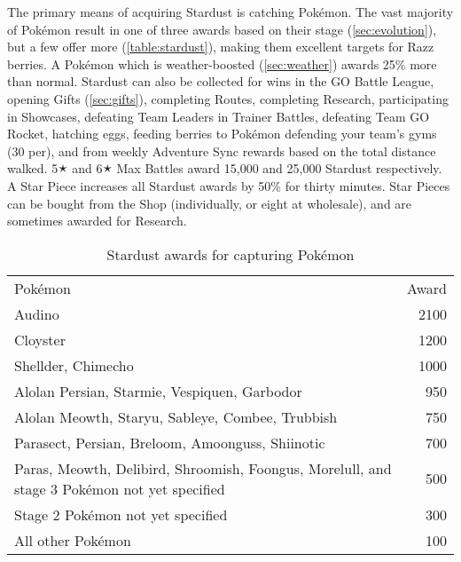 The primary means of acquiring Stardust is catching Pokémon.
The vast majority of Pokémon result in one of three awards based on their stage
 (\autoref{sec:evolution}), but a few offer more (\autoref{table:stardust}),
 making them excellent targets for Razz berries.
A Pokémon which is weather-boosted (\autoref{sec:weather}) awards 25\% more than normal.
Stardust can also be collected for wins in the GO Battle League,
  opening Gifts (\autoref{sec:gifts}),
  completing Routes,
  completing Research,
  participating in Showcases,
  defeating Team Leaders in Trainer Battles,
  defeating Team GO Rocket,
  hatching eggs,
  feeding berries to Pokémon defending your team's gyms (30 per),
  and from weekly Adventure Sync rewards based on the total distance walked.
5🟉 and 6🟉 Max Battles award 15,000 and 25,000 Stardust respectively.
A Star Piece increases all Stardust awards by 50\% for thirty minutes.
Star Pieces can be bought from the Shop (individually, or eight at wholesale), and are sometimes awarded for Research.
\begin{table}
\centering
\begin{tabular}{p{}r}
Pokémon & Award \\ %
\Midrule
Audino & 2100 \\ %
\rowcolor{Gray!25}
Cloyster & 1200 \\%
Shellder, Chimecho & 1000 \\%
\rowcolor{Gray!25}
Alolan Persian, Starmie, Vespiquen, Garbodor & 950 \\%
  Alolan Meowth, Staryu, Sableye, Combee, Trubbish & 750 \\
\rowcolor{Gray!25}
Parasect, Persian, Breloom, Amoonguss, Shiinotic & 700\\%
Paras, Meowth, Delibird, Shroomish, Foongus,\newline
\hspace{\parindent}Morelull, and stage 3 Pokémon not yet specified & 500\\%
\rowcolor{Gray!25}
Stage 2 Pokémon not yet specified & 300 \\%
All other Pokémon & 100 \\%
\end{tabular}
\caption{Stardust awards for capturing Pokémon\label{table:stardust}}
\end{table}
